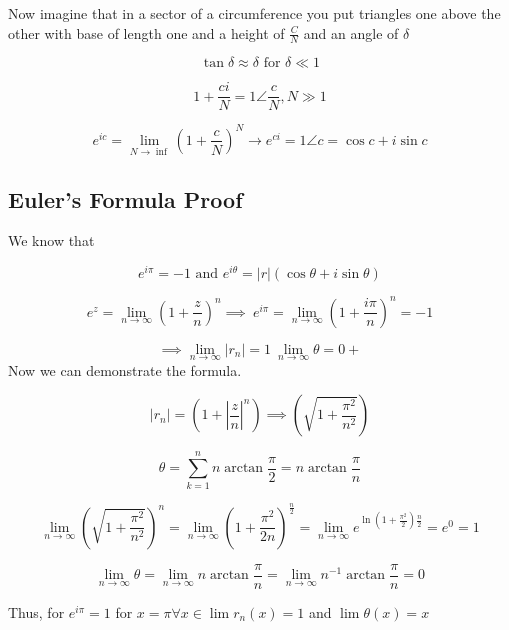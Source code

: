 Now imagine that in a sector of a circumference you put triangles one above the other with base of 
length one and a height of \(\frac{C}{N}\) and 
an angle of \(\delta\)

\[
	\tan{\delta} \approx \delta \text{ for } \delta \ll 1
\]

\[
	1 + \frac{ci}{N} = 1 \angle \frac{c}{N}, N \gg 1
\]

\[
	e^{ic} = \lim_{N \to \inf} {\left( 1 + \frac{c}{N}\right)}^N \to e^{ci} = 1 \angle c = \cos{c} + 
	i\sin{c}
\]

\subsection{Euler's Formula Proof}

We know that

\[
	e^{i\pi} = -1 \text{ and } e^{i\theta} = |r|(\cos{\theta} + i\sin{\theta})
\]

\[
	e^{z} = \lim_{n \to \infty} {\left( 1 + \frac{z}{n}\right)}^n \implies\ e^{i\pi} = 
	\lim_{n \to \infty} {\left( 1 + \frac{i\pi}{n}\right)}^n = -1
\]

\[
	\implies \lim_{n \to \infty} |r_n| = 1\ \lim_{n \to \infty} \theta = 0+
\]
 Now we can demonstrate the formula.

\[
	|r_n| = \left( 1 + \left|\frac{z}{n}\right|^n \right) \implies 
	\left( \sqrt{1 + \frac{\pi^2}{n^2}}\right)
\]

\[
	\theta = \sum_{k = 1}^{n} n \arctan \frac{\pi}{2} = n \arctan \frac{\pi}{n}
\]

\[
	\lim_{n \to \infty} {\left( \sqrt{1 + \frac{\pi^2}{n^2}}\right)}^n = \lim_{n \to \infty} 
	{\left( 1 + \frac{\pi^2}{2n} \right) }^{\frac{n}{2}}
	= \lim_{n \to \infty} e^{\ln\left(1 +\frac{\pi^2}{2}\right) \frac{n}{2}} = e^0 = 1
\]

\[
	\lim_{n \to \infty} \theta = \lim_{n \to \infty} n \arctan \frac{\pi}{n} = \lim_{n \to \infty} 
	n^{-1} \arctan\frac{\pi}{n} = 0
\]

Thus, for \(e^{i\pi} = 1\) for \(x = \pi \forall x \in \lim r_n (x) = 1\) and \( \lim \theta (x) = x\)

\QED
